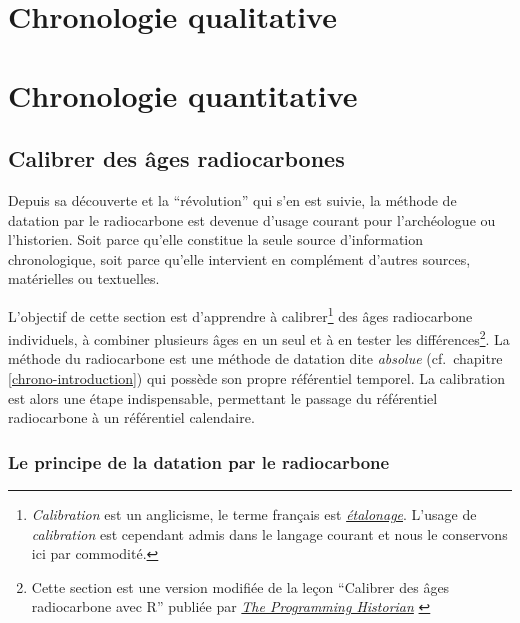 \documentclass[
  french,
]{scrbook}
\begin{document}
\hypertarget{chronologie-qualitative}{%
\chapter{Chronologie qualitative}\label{chronologie-qualitative}}

\hypertarget{chronologie-quantitative}{%
\chapter{Chronologie quantitative}\label{chronologie-quantitative}}

\hypertarget{calibrer-des-uxe2ges-radiocarbones}{%
\section{Calibrer des âges radiocarbones}\label{calibrer-des-uxe2ges-radiocarbones}}

Depuis sa découverte et la ``révolution'' qui s'en est suivie, la méthode de datation par le radiocarbone est devenue d'usage courant pour l'archéologue ou l'historien. Soit parce qu'elle constitue la seule source d'information chronologique, soit parce qu'elle intervient en complément d'autres sources, matérielles ou textuelles.

L'objectif de cette section est d'apprendre à calibrer\footnote{\emph{Calibration} est un anglicisme, le terme français est \href{https://fr.wikipedia.org/wiki/\%C3\%89talonnage_(m\%C3\%A9trologie)}{\emph{étalonage}}. L'usage de \emph{calibration} est cependant admis dans le langage courant et nous le conservons ici par commodité.} des âges radiocarbone individuels, à combiner plusieurs âges en un seul et à en tester les différences\footnote{Cette section est une version modifiée de la leçon ``Calibrer des âges radiocarbone avec R'' publiée par \href{https://programminghistorian.org/}{\emph{The Programming Historian}} \autocite{frerebeau2021}}. La méthode du radiocarbone est une méthode de datation dite \emph{absolue} (cf.~chapitre \ref{chrono-introduction}) qui possède son propre référentiel temporel. La calibration est alors une étape indispensable, permettant le passage du référentiel radiocarbone à un référentiel calendaire.

\hypertarget{le-principe-de-la-datation-par-le-radiocarbone}{%
\subsection{Le principe de la datation par le radiocarbone}\label{le-principe-de-la-datation-par-le-radiocarbone}}
\end{document}
